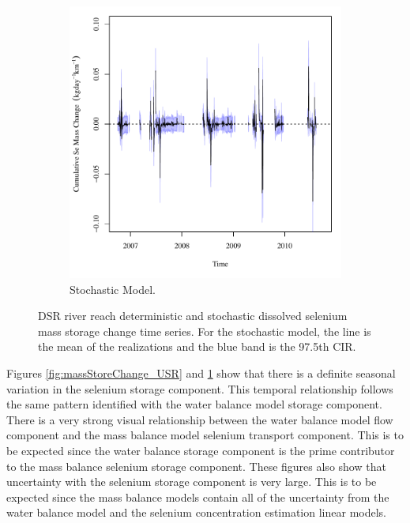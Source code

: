 \begin{linenumbers}
\begin{landscape}
\begin{figure}
\begin{subfigure}{0.7\textwidth}
			\includegraphics[width=\tableCustomSize]{"Figures/Results_DSR/Stochastic/Balance Mass - Storage"}
			\caption{Stochastic Model.}
		\end{subfigure}
		\caption[DSR river reach deterministic and stochastic dissolved selenium mass storage change time series.]{DSR river reach deterministic and stochastic dissolved selenium mass storage change time series.  For the stochastic model, the line is the mean of the realizations and the blue band is the 97.5th CIR.}
		\label{fig:massStoreChange_DSR}
	\end{figure}
\end{landscape}
\subfiguretop

Figures \ref{fig:massStoreChange_USR} and \ref{fig:massStoreChange_DSR} show that there is a definite seasonal variation in the selenium storage component.  This temporal relationship follows the same pattern identified with the water balance model storage component.  There is a very strong visual relationship between the water balance model flow component and the mass balance model selenium transport component.  This is to be expected since the water balance storage component is the prime contributor to the mass balance selenium storage component.  These figures also show that uncertainty with the selenium storage component is very large.  This is to be expected since the mass balance models contain all of the uncertainty from the water balance model and the selenium concentration estimation linear models.


\end{linenumbers}

